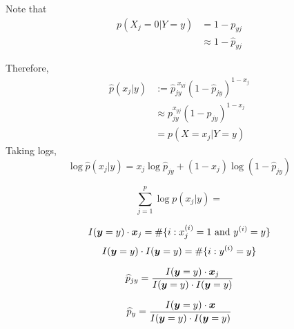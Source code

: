 \documentclass[12pt]{amsart}
\begin{document}
Note that
\begin{align*}
    p(X_j=0|Y=y) &=1 - p_{yj}\\
    &\approx 1-\hat p_{yj}
\end{align*}

Therefore,
\begin{align*}
    \hat p(x_j|y) &:= \hat p_{jy}^{\;x_{yj}}(1-\hat p_{jy})^{1-x_j}\\
    &\approx p_{jy}^{x_{yj}}(1-p_{jy})^{1-x_j}\\
    &= p(X=x_j|Y=y)
\end{align*}
Taking logs,
\[
    \log \hat p(x_j|y) = x_j\log \hat p_{jy} + (1-x_j)\log(1-\hat p_{jy})
\]

\[
    \sum_{j=1}^p\log p(x_j|y) = 
\]

\[
    I(\boldsymbol{y} = y)\cdot \boldsymbol{x}_j = \#\{i : \text{$x^{(i)}_j = 1$ and $y^{(i)}=y$}\}
\]
\[
    I(\boldsymbol{y} = y)\cdot I(\boldsymbol{y} = y) = \#\{i : y^{(i)}=y\}
\]

\[
    \widehat p_{jy} = \frac{I(\boldsymbol{y} = y)\cdot \boldsymbol{x}_j}{I(\boldsymbol{y} = y)\cdot I(\boldsymbol{y} = y)}
\]

\[
    \widehat p_y = \frac{I(\boldsymbol{y} = y)\cdot \boldsymbol{x}}{I(\boldsymbol{y} = y)\cdot I(\boldsymbol{y} = y)}
\]
\end{document}
